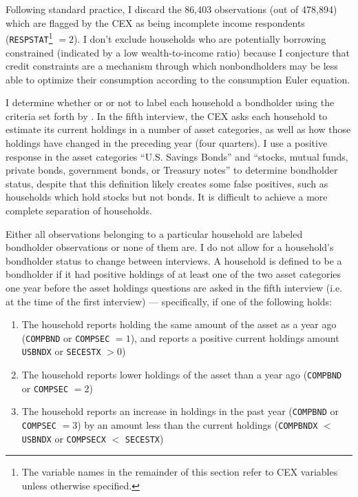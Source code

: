 Following standard practice, I discard the 86,403 observations (out of 478,894) which are flagged by the CEX as being incomplete income respondents (\texttt{RESPSTAT}\footnote{The variable names in the remainder of this section refer to CEX variables unless otherwise specified.} $= 2$). I don't exclude households who are potentially borrowing constrained (indicated by a low wealth-to-income ratio) because I conjecture that credit constraints are a mechanism through which nonbondholders may be less able to optimize their consumption according to the consumption Euler equation.

I determine whether or or not to label each household a bondholder using the criteria set forth by \cite{vissing02}. In the fifth interview, the CEX asks each household to estimate its current holdings in a number of asset categories, as well as how those holdings have changed in the preceding year (four quarters). I use a positive response in the asset categories ``U.S. Savings Bonds'' and ``stocks, mutual funds, private bonds, government bonds, or Treasury notes'' to determine bondholder status, despite that this definition likely creates some false positives, such as households which hold stocks but not bonds. It is difficult to achieve a more complete separation of households.

Either all observations belonging to a particular household are labeled bondholder observations or none of them are. I do not allow for a household's bondholder status to change between interviews. A household is defined to be a bondholder if it had positive holdings of at least one of the two asset categories one year before the asset holdings questions are asked in the fifth interview (i.e. at the time of the first interview) --- specifically, if one of the following holds:
\begin{enumerate}
\item The household reports holding the same amount of the asset as a year ago (\texttt{COMPBND} or \texttt{COMPSEC} $= 1$), and reports a positive current holdings amount \texttt{USBNDX} or \texttt{SECESTX} $> 0$)
\item The household reports lower holdings of the asset than a year ago (\texttt{COMPBND} or \texttt{COMPSEC} $= 2$)
\item The household reports an increase in holdings in the past year (\texttt{COMPBND} or \texttt{COMPSEC} $= 3$) by an amount less than the current holdings (\texttt{COMPBNDX} $<$ \texttt{USBNDX} or \texttt{COMPSECX} $<$ \texttt{SECESTX})
\end{enumerate}

